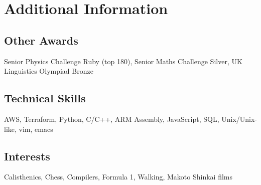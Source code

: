 \section{Additional Information}
\subsection{Other Awards}{}{\hfill Senior Physics Challenge Ruby (top 180), Senior Maths Challenge Silver, UK Linguistics Olympiad Bronze}
\subsection{Technical Skills}{}{\hspace{10mm}AWS, Terraform, Python, C/C+{+}, ARM Assembly, JavaScript, SQL, Unix/Unix-like, vim, emacs}
\subsection{Interests}{}{\hfill Calisthenics, Chess, Compilers, Formula 1, Walking, Makoto Shinkai films}
